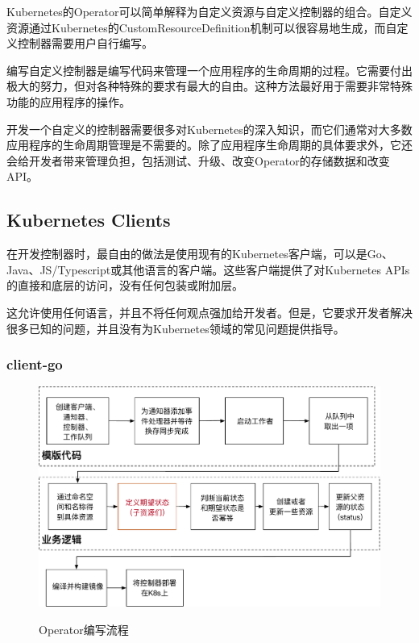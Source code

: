 \documentclass[macfonts,master]{njuthesis}
\begin{document}
Kubernetes的Operator可以简单解释为自定义资源与自定义控制器的组合。自定义资源通过Kubernetes的CustomResourceDefinition机制可以很容易地生成，而自定义控制器需要用户自行编写。

编写自定义控制器是编写代码来管理一个应用程序的生命周期的过程。它需要付出极大的努力，但对各种特殊的要求有最大的自由。这种方法最好用于需要非常特殊功能的应用程序的操作。

开发一个自定义的控制器需要很多对Kubernetes的深入知识，而它们通常对大多数应用程序的生命周期管理是不需要的。除了应用程序生命周期的具体要求外，它还会给开发者带来管理负担，包括测试、升级、改变Operator的存储数据和改变API\cite{kudovscc}。

\subsection{Kubernetes Clients}

在开发控制器时，最自由的做法是使用现有的Kubernetes客户端，可以是Go、Java、JS/Typescript或其他语言的客户端。这些客户端提供了对Kubernetes APIs的直接和底层的访问，没有任何包装或附加层。

这允许使用任何语言，并且不将任何观点强加给开发者。但是，它要求开发者解决很多已知的问题，并且没有为Kubernetes领域的常见问题提供指导\cite{kudovscc}。

\subsubsection{client-go}


\begin{figure}[htbp]
  \centering
  \includegraphics[width= 1\textwidth]{pics/coding-operator.pdf}\\
  \caption{Operator编写流程}\label{fig:coding-operator}
\end{figure}
\end{document}
